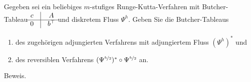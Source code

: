 \begin{exercise}
  Gegeben sei ein beliebiges $m$-stufiges Runge-Kutta-Verfahren mit Butcher-Tableau
  \renewcommand{\arraystretch}{1.5}
    $\begin{matrix}
    c & \vline & A \\
    \hline
    0 & \vline & b^{\top}
    \end{matrix}$
    und diskretem Fluss $\Psi^h$. Geben Sie die Butcher-Tableaus
    \begin{enumerate}[label = \textbf{\alph*)}]
      \item des zugehörigen adjungierten Verfahrens mit adjungiertem Fluss $(\Psi^h)^*$ und
      \item des reversiblen Verfahrens $(\Psi^{\nicefrac{h}{2}})^* \circ \Psi^{\nicefrac{h}{2}}$ an.
    \end{enumerate}
\end{exercise}

\begin{solution}
Beweis.
\end{solution}
